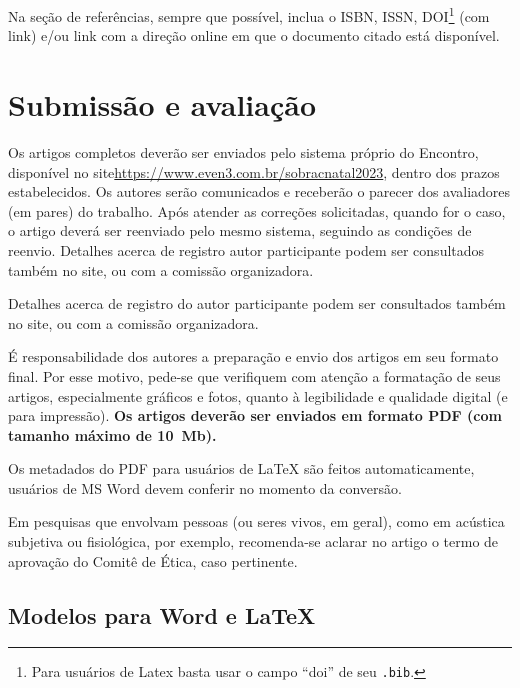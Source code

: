 \documentclass[12pt, a4paper, twoside, onecolumn]{article}
\begin{document}
Na seção de referências, sempre que possível, inclua o ISBN, ISSN, DOI\footnote{Para usuários de Latex basta usar o campo ``doi'' de seu \texttt{.bib}.} (com link) e/ou link com a direção online em que o documento citado está disponível.

\section{Submissão e avaliação}

Os artigos completos deverão ser enviados pelo sistema próprio do Encontro, disponível no site\linebreak \url{https://www.even3.com.br/sobracnatal2023}, dentro dos prazos estabelecidos. Os autores serão comunicados e receberão o parecer dos avaliadores (em pares) do trabalho. Após atender as correções solicitadas, quando for o caso, o artigo deverá ser reenviado pelo mesmo sistema, seguindo as condições de reenvio. Detalhes acerca de registro autor participante podem ser consultados também no site, ou com a comissão organizadora.

Detalhes acerca de registro do autor participante podem ser consultados também no site, ou com a comissão organizadora.

É responsabilidade dos autores a preparação e envio dos artigos em seu formato final. Por esse motivo, pede-se que verifiquem com atenção a formatação de seus artigos, especialmente gráficos e fotos, quanto à legibilidade e qualidade digital (e para impressão). \textbf{Os artigos deverão ser enviados em formato PDF (com tamanho máximo de 10~Mb).} 

Os metadados do PDF para usuários de \LaTeX\xspace são feitos automaticamente, usuários de MS Word devem conferir no momento da conversão.


Em pesquisas que envolvam pessoas (ou seres vivos, em geral), como em acústica subjetiva ou fisiológica, por exemplo, recomenda-se aclarar no artigo o termo de aprovação do Comitê de Ética, caso pertinente.



\subsection{Modelos para Word e \LaTeX}
\end{document}
